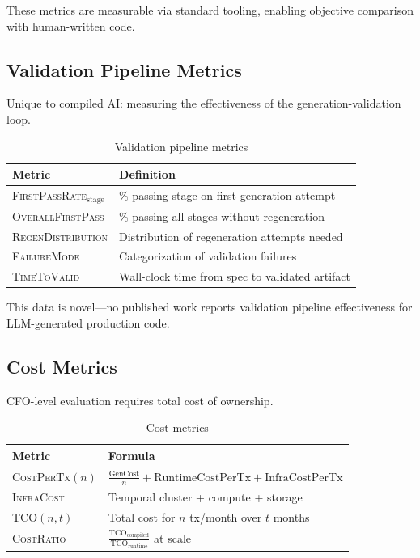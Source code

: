 \documentclass[11pt]{article}
\newcommand{\metric}[1]{\textsc{#1}}
\begin{document}
These metrics are measurable via standard tooling, enabling objective comparison with human-written code.

\subsection{Validation Pipeline Metrics}

Unique to compiled AI: measuring the effectiveness of the generation-validation loop.

\begin{table}[ht]
\centering
\caption{Validation pipeline metrics}
\label{tab:validation-metrics}
\begin{tabular}{p{4cm}p{8cm}}
\toprule
Metric & Definition \\
\midrule
\metric{FirstPassRate}$_{\text{stage}}$ & \% passing stage on first generation attempt \\
\metric{OverallFirstPass} & \% passing all stages without regeneration \\
\metric{RegenDistribution} & Distribution of regeneration attempts needed \\
\metric{FailureMode} & Categorization of validation failures \\
\metric{TimeToValid} & Wall-clock time from spec to validated artifact \\
\bottomrule
\end{tabular}
\end{table}

This data is novel---no published work reports validation pipeline effectiveness for LLM-generated production code.

\subsection{Cost Metrics}

CFO-level evaluation requires total cost of ownership.

\begin{table}[ht]
\centering
\caption{Cost metrics}
\label{tab:cost-metrics}
\begin{tabular}{p{3.5cm}p{8.5cm}}
\toprule
Metric & Formula \\
\midrule
\metric{CostPerTx}$(n)$ & $\frac{\text{GenCost}}{n} + \text{RuntimeCostPerTx} + \text{InfraCostPerTx}$ \\
\metric{InfraCost} & Temporal cluster + compute + storage \\
\metric{TCO}$(n, t)$ & Total cost for $n$ tx/month over $t$ months \\
\metric{CostRatio} & $\frac{\text{TCO}_{\text{compiled}}}{\text{TCO}_{\text{runtime}}}$ at scale \\
\bottomrule
\end{tabular}
\end{table}
\end{document}
